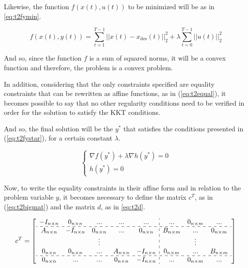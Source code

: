 Likewise, the function $f(x(t), u(t))$ to be minimized will be as in \eqref{eq:t2fymin}.

\begin{equation}
\label{eq:t2fymin}
    f(x(t),y(t)) = \sum_{t=1}^{T-1} ||x(t) - x_{\text{des}}(t)||_2^2 + \lambda \sum_{t=0}^{T-1} ||u(t)||_2^2
\end{equation}

And so, since the function $f$ is a sum of squared norms, it will be a convex function and therefore, the problem is a convex problem.

In addition, considering that the only constraints specified are equality constraints that can be rewritten as affine functions, as in (\ref{eq:t2equal}), it becomes possible to say that no  other regularity conditions need to be verified in order for the solution to satisfy the KKT conditions.

And so, the final solution will be the $y^*$ that satisfies the conditions presented in (\ref{eq:t2fystar}), for a certain constant $\lambda$.

\begin{equation}
\label{eq:t2fystar}
\begin{cases}
	\nabla f(y^*) + \lambda \nabla h(y^*) = 0 \\
	h(y^*) = 0
\end{cases}
\end{equation}

Now, to write the equality constraints in their affine form and in relation to the problem variable $y$, it becomes necessary to define the matrix $c^T$, as in (\ref{eq:t2bigmat}) and the matrix $d$, as in \eqref{eq:t2d}.

\begin{equation}
\label{eq:t2bigmat}
c^T =
\left[
\begin{array}{c c c c c : c c c}
-I_{n\times n}  & 0_{n \times n} & ... & ... & ... & ... & 0_{n \times m} & ... \\ \hdashline
A_{n\times n} & -I_{n\times n} & 0_{n\times n} & ... & 0_{n\times n} & B_{n\times m} &...& 0_{n\times m} \\
\ & \ & \vdots & \ & \ & \ & \vdots & \ \\
0_{n \times n} & 0_{n \times n} & ... & A_{n \times n} & -I_{n \times n} & 0_{n \times m} & ... & B_{n \times m} \\ \hdashline
0_{n\times n} & ... & ... & 0_{n\times n} & - I_{n \times n} & ... & 0_{n \times m} & ... \\
\end{array}
\right]
\end{equation}

